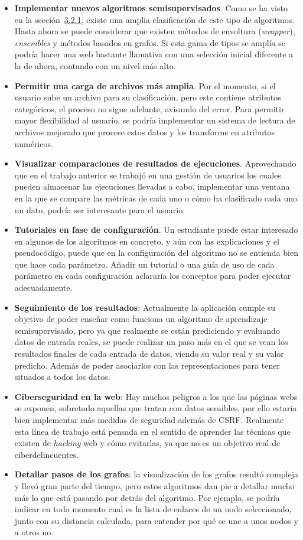 \begin{itemize}
	\item \textbf{Implementar nuevos algoritmos semisupervisados}. Como se ha visto en la sección~\hyperref[sec3:tax]{3.2.1}, existe una amplia clasificación de este tipo de algoritmos. Hasta ahora se puede considerar que existen métodos de envoltura (\textit{wrapper}), \textit{ensembles} y métodos basados en grafos. Si esta gama de tipos se amplía se podría hacer una web bastante llamativa con una selección inicial diferente a la de ahora, contando con un nivel más alto.
	\item \textbf{Permitir una carga de archivos más amplia}. Por el momento, si el usuario sube un archivo para su clasificación, pero este contiene atributos categóricos, el proceso no sigue adelante, avisando del error. Para permitir mayor flexibilidad al usuario, se podría implementar un sistema de lectura de archivos mejorado que procese estos datos y los transforme en atributos numéricos.
	\item \textbf{Visualizar comparaciones de resultados de ejecuciones}. Aprovechando que en el trabajo anterior se trabajó en una gestión de usuarios los cuales pueden almacenar las ejecuciones llevadas a cabo, implementar una ventana en la que se compare las métricas de cada uno o cómo ha clasificado cada uno un dato, podría ser interesante para el usuario.
	\item \textbf{Tutoriales en fase de configuración}. Un estudiante puede estar interesado en algunos de los algoritmos en concreto, y aún con las explicaciones y el pseudocódigo, puede que en la configuración del algoritmo no se entienda bien que hace cada parámetro. Añadir un tutorial o una guía de uso de cada parámetro en cada configuración aclararía los conceptos para poder ejecutar adecuadamente.
	\item \textbf{Seguimiento de los resultados}: Actualmente la aplicación cumple su objetivo de poder enseñar como funciona un algoritmo de aprendizaje semisupervisado, pero ya que realmente se están prediciendo y evaluando datos de entrada reales, se puede realizar un paso más en el que se vean los resultados finales de cada entrada de datos, viendo su valor real y su valor predicho. Además de poder asociarlos con las representaciones para tener situados a todos los datos.
	\item \textbf{Ciberseguridad en la web}: Hay muchos peligros a los que las páginas webs se exponen, sobretodo aquellas que tratan con datos sensibles, por ello estaría bien implementar más medidas de seguridad además de CSRF. Realmente esta línea de trabajo está pensada en el sentido de aprender las técnicas que existen de \textit{hacking} web y cómo evitarlas, ya que no es un objetivo real de ciberdelincuentes.
	\item \textbf{Detallar pasos de los grafos}: la visualización de los grafos resultó compleja y llevó gran parte del tiempo, pero estos algoritmos dan pie a detallar mucho más lo que está pasando por detrás del algoritmo. Por ejemplo, se podría indicar en todo momento cual es la lista de enlaces de un nodo seleccionado, junto con su distancia calculada, para entender por qué se une a unos nodos y a otros no.
\end{itemize}